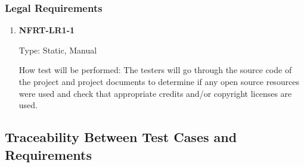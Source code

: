 \documentclass[12pt, titlepage]{article}
\begin{document}
\subsubsection{Legal Requirements}
\begin{enumerate}
	\item \textbf{NFRT-LR1-1}

	      Type: Static, Manual

	      How test will be performed: The testers will go through the source code of the project and project
	      documents to determine if any open source resources were used and check that appropriate credits
	      and/or copyright licenses are used.

\end{enumerate}

\newpage
\begin{landscape}
	\subsection{Traceability Between Test Cases and Requirements}


\end{landscape}
\end{document}
